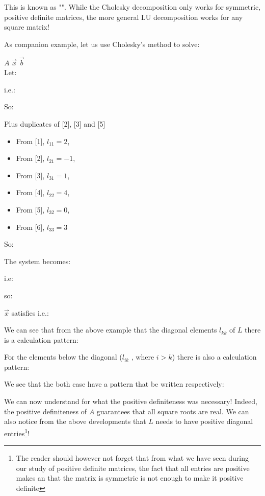 	This is known as "". While the Cholesky decomposition only works for symmetric, positive definite matrices, the more general LU decomposition works for any square matrix!
	
	\pagebreak
	As companion example, let us use Cholesky's method to solve:
	
	\hspace{6.5cm} $A$ \hspace{1.4cm} $\vec{x}$ \hspace{1.4cm}
	$\vec{b}$ \\
	Let:
	
	i.e.:
	
	So:
	
	Plus duplicates of [2], [3] and [5]
	\begin{itemize}
		\item From [1], $l_{11} = 2$,
		\item From [2], $l_{21} = -1$,
		\item From [3], $l_{31} = 1$,
		\item From [4], $l_{22} = 4$,
		\item From [5], $l_{32} = 0$,
		\item From [6], $l_{33} = 3$ 
	\end{itemize}
	So:
	
	The system becomes:
	
	i.e:
	
	so:
	
	$\vec{x}$ satisfies i.e.:
	
	
	
	
	We can see that from the above example that the diagonal elements $l_{kk}$ of $L$ there is a calculation pattern:
	
	For the elements below the diagonal ($l_{ik}$ , where $i>k$) there is also a calculation pattern:
	
	We see that the both case have a pattern that be written respectively:
	
	We can now understand for what the positive definiteness was necessary! Indeed, the positive definiteness of $A$ guarantees that all square roots are real. We can also notice from the above developments that $L$ needs to have positive diagonal entries\footnote{The reader should however not forget that from what we have seen during our study of positive definite matrices, the fact that all entries are positive makes an that the matrix is symmetric is not enough to make it positive definite}!
	
